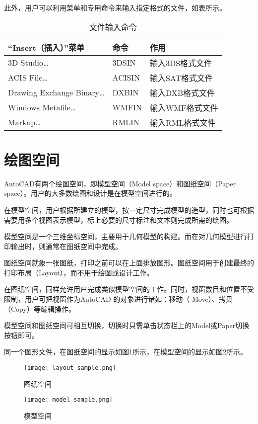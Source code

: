 此外，用户可以利用菜单和专用命令来输入指定格式的文件，如表所示。

\begin{table}[htbp]
\centering
\caption{文件输入命令}
\begin{tabular}{|l|l|l|}
\hline
“Insert（插入）”菜单	&  命令			& 作用			\\
\hline
3D Studio…			& 3DSIN		& 输入3DS格式文件	\\
\hline
ACIS File…			& ACISIN		& 输入SAT格式文件	\\
\hline
Drawing Exchange Binary…	& DXBIN	& 输入DXB格式文件	\\
\hline
Windows Metafile…	& WMFIN		& 输入WMF格式文件	\\
\hline
Markup…			& RMLIN		& 输入RML格式文件	\\
\hline
\end{tabular}
\end{table}

\chapter{绘图空间}

AutoCAD有两个绘图空间，即模型空间（Model space）和图纸空间（Paper space）。用户的大多数绘图和设计是在模型空间进行的。

在模型空间，用户根据所建立的模型，按一定尺寸完成模型的造型，同时也可根据需要用多个视图表示模型，标上必要的尺寸标注和文本则完成所需的绘图。

模型空间是一个三维坐标空间，主要用于几何模型的构建。而在对几何模型进行打印输出时，则通常在图纸空间中完成。

图纸空间就象一张图纸，打印之前可以在上面排放图形。图纸空间用于创建最终的打印布局（Layout），而不用于绘图或设计工作。


在图纸空间，同样允许用户完成类似模型空间的工作。同时，视窗数目和位置不受限制，用户可把视窗作为AutoCAD 的对象进行诸如：移动（ Move）、拷贝（Copy）等编辑操作。

模型空间和图纸空间可相互切换，切换时只需单击状态栏上的Model或Paper切换按钮即可。

同一个图形文件，在图纸空间的显示如图1所示，在模型空间的显示如图2所示。

\begin{figure}[htbp]
\centering
\texttt{[image: layout\_sample.png]}
\caption{图纸空间}
\end{figure}

\begin{figure}[htbp]
\centering
\texttt{[image: model\_sample.png]}
\caption{模型空间}
\end{figure}


